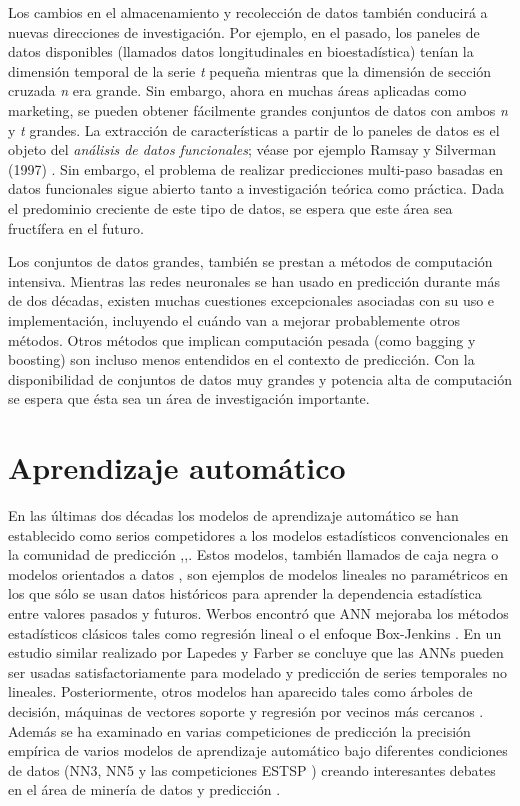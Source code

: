 \documentclass{llncs}
\begin{document}
Los cambios en el almacenamiento y recolección de datos también conducirá a nuevas direcciones de investigación. Por ejemplo, en el pasado, los paneles de datos disponibles (llamados datos longitudinales en bioestadística) tenían la dimensión temporal de la serie \emph{t} pequeña mientras que la dimensión de sección cruzada \emph{n} era grande. Sin embargo, ahora en muchas áreas aplicadas como marketing, se pueden obtener fácilmente grandes conjuntos de datos con ambos \emph{n} y \emph{t} grandes. La extracción de características a partir de lo paneles de datos es el objeto del \emph{análisis de datos funcionales}; véase por ejemplo  Ramsay y Silverman (1997) \cite{Ramsay1997}. Sin embargo, el problema de realizar predicciones multi-paso basadas en datos funcionales sigue abierto tanto a investigación teórica como práctica. Dada el predominio creciente de este tipo de datos, se espera que este área sea fructífera en el futuro.

Los conjuntos de datos grandes, también se prestan a métodos de computación intensiva. Mientras las redes neuronales se han usado en predicción durante más de dos décadas, existen muchas cuestiones excepcionales asociadas con su uso e implementación, incluyendo el cuándo van a mejorar probablemente otros métodos. Otros métodos que implican computación pesada (como bagging y boosting) son incluso menos entendidos en el contexto de predicción. Con la disponibilidad de conjuntos de datos muy grandes y potencia alta de computación se espera que ésta sea un área de investigación importante.

\section{Aprendizaje automático}
En las últimas dos décadas los modelos de aprendizaje automático se han establecido como serios competidores a los modelos estadísticos convencionales en la comunidad de predicción \cite{Ahmed2010594},\cite{Palit2005},\cite{Zhang199835}. Estos modelos, también llamados de caja negra o modelos orientados a datos \cite{Mitchell1997}, son ejemplos de modelos lineales no paramétricos en los que sólo se usan datos históricos para aprender la dependencia estadística entre valores pasados y futuros. Werbos encontró que ANN mejoraba los métodos estadísticos clásicos tales como regresión lineal o el enfoque Box-Jenkins \cite{Werbos1974} \cite{Werbos1988339}. En un estudio similar realizado por Lapedes y Farber \cite{Lapedes1987} se concluye que las ANNs pueden ser usadas satisfactoriamente para modelado y predicción de series temporales no lineales. Posteriormente, otros modelos han aparecido tales como árboles de decisión, máquinas de vectores soporte y regresión por vecinos más cercanos \cite{Hastie2001} \cite{Alpaydin2004}. Además se ha examinado en varias competiciones de predicción la precisión empírica de varios modelos de aprendizaje automático bajo diferentes condiciones de datos (NN3, NN5 y las competiciones ESTSP \cite{Crone2009456}\cite{Crone}\cite{Lendasse2007}) creando interesantes debates en el área de minería de datos y predicción \cite{Hand2008}\cite{Price2009452}\cite{Crone2009456}.
\end{document}
